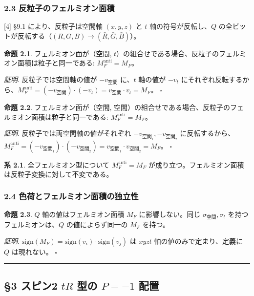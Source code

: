 \documentclass[
  a4paper,11pt]{ltjsarticle}
\begin{document}
\subsubsection{2.3
反粒子のフェルミオン面積}\label{ux53cdux7c92ux5b50ux306eux30d5ux30a7ux30ebux30dfux30aaux30f3ux9762ux7a4d}

{[}4{]} §9.1 により、反粒子は空間軸 \((x, y, z)\) と \(t\)
軸の符号が反転し、\(Q\)
の全ビットが反転する（\((R,G,B) \to (\bar{R},\bar{G},\bar{B})\)）。

\textbf{命題 2.1}. フェルミオン面が（空間,
\(t\)）の組合せである場合、反粒子のフェルミオン面積は粒子と同一である:
\(M_F^{\text{anti}} = M_F\)。

\emph{証明}. 反粒子では空間軸の値が \(-v_{\text{空間}}\) に、\(t\)
軸の値が \(-v_t\)
にそれぞれ反転するから、\(M_F^{\text{anti}} = (-v_{\text{空間}}) \cdot (-v_t) = v_{\text{空間}} \cdot v_t = M_F\)。
\(\square\)

\textbf{命題 2.2}. フェルミオン面が（空間,
空間）の組合せである場合、反粒子のフェルミオン面積は粒子と同一である:
\(M_F^{\text{anti}} = M_F\)。

\emph{証明}. 反粒子では両空間軸の値がそれぞれ
\(-v_{\text{空間}_1}, -v_{\text{空間}_2}\)
に反転するから、\(M_F^{\text{anti}} = (-v_{\text{空間}_1}) \cdot (-v_{\text{空間}_2}) = v_{\text{空間}_1} \cdot v_{\text{空間}_2} = M_F\)。
\(\square\)

\textbf{系 2.1}. 全フェルミオン型について \(M_F^{\text{anti}} = M_F\)
が成り立つ。フェルミオン面積は反粒子変換に対して不変である。

\subsubsection{2.4
色荷とフェルミオン面積の独立性}\label{ux8272ux8377ux3068ux30d5ux30a7ux30ebux30dfux30aaux30f3ux9762ux7a4dux306eux72ecux7acbux6027}

\textbf{命題 2.3}. \(Q\) 軸の値はフェルミオン面積 \(M_F\)
に影響しない。同じ \(\sigma_{\text{空間}}, \sigma_t\)
を持つフェルミオンは、\(Q\) の値によらず同一の \(M_F\) を持つ。

\emph{証明}.
\(\text{sign}(M_F) = \text{sign}(v_i) \cdot \text{sign}(v_j)\) は
\(xyzt\) 軸の値のみで定まり、定義に \(Q\) は現れない。 \(\square\)

\begin{center}\rule{0.5\linewidth}{0.5pt}\end{center}

\subsection{\texorpdfstring{§3 スピン2 \(tR\) 型の \(P = -1\)
配置}{§3 スピン2 tR 型の P = -1 配置}}\label{ux30b9ux30d4ux30f32-tr-ux578bux306e-p--1-ux914dux7f6e}
\end{document}
